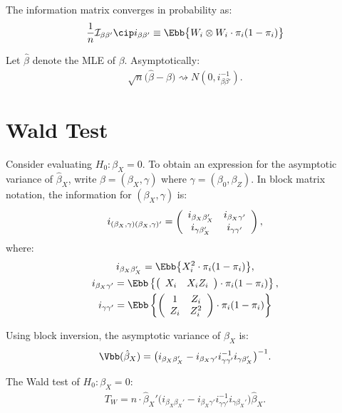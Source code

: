 The information matrix converges in probability as:
\begin{align*}
\frac{1}{n} \mathcal{I}_{\beta\beta'} \cip i_{\beta\beta'} \equiv \Ebb\big\{W_{i} \otimes W_{i} \cdot \pi_{i}(1 - \pi_{i})\big\}
\end{align*}

Let $\hat{\beta}$ denote the MLE of $\beta$. Asymptotically:
\begin{align*}
\sqrt{n}\big(\hat{\beta} - \beta \big) \rightsquigarrow N(0, i_{\beta\beta'}^{-1}). 
\end{align*}

\section{Wald Test}

Consider evaluating $H_{0}: \beta_{X} = 0$. To obtain an expression for the asymptotic variance of $\hat{\beta}_{X}$, write $\beta = (\beta_{X}, \gamma)$ where $\gamma = (\beta_{0}, \beta_{Z})$. In block matrix notation, the information for $(\beta_{X}, \gamma)$ is:
\begin{align*}
i_{(\beta_{X}, \gamma)(\beta_{X}, \gamma)'} = \left(
\begin{array}{c c}
i_{\beta_{X}\beta_{X}'} & i_{\beta_{X}\gamma'} \\
i_{\gamma\beta_{X}'} & i_{\gamma\gamma'}
\end{array}
\right),
\end{align*}
where:
\begin{gather*}
i_{\beta_{X}\beta_{X}'} = \Ebb\big\{X_{i}^{2} \cdot \pi_{i} (1 - \pi_{i}) \big\}, \\
i_{\beta_{X}\gamma'} = \Ebb\left\{
\big(
\begin{array}{c c}
X_{i} & X_{i}Z_{i}
\end{array} \big)
\cdot \pi_{i}(1 - \pi_{i}) \right\}, \\
i_{\gamma\gamma'} = \Ebb\left\{
\left(
\begin{array}{c c}
1 & Z_{i} \\
Z_{i} & Z_{i}^{2}
\end{array}
\right) \cdot \pi_{i} (1 - \pi_{i})
\right\}
\end{gather*}

Using block inversion, the asymptotic variance of $\beta_{X}$ is:
\begin{align*}
\Vbb(\hat{\beta}_{X}) = \big(i_{\beta_{X}\beta_{X}'} - i_{\beta_{X}\gamma'} i_{\gamma\gamma'}^{-1}i_{\gamma\beta_{X}'}\big)^{-1}.
\end{align*}

The Wald test of $H_{0}: \beta_{X} = 0$:
\begin{align*}
T_{W} = n \cdot \hat{\beta}_{X}'\big(i_{\beta_{X}\beta_{X}'} - i_{\beta_{X}\gamma'} i_{\gamma\gamma'}^{-1}i_{\gamma\beta_{X}'}\big)\hat{\beta}_{X}.
\end{align*}



